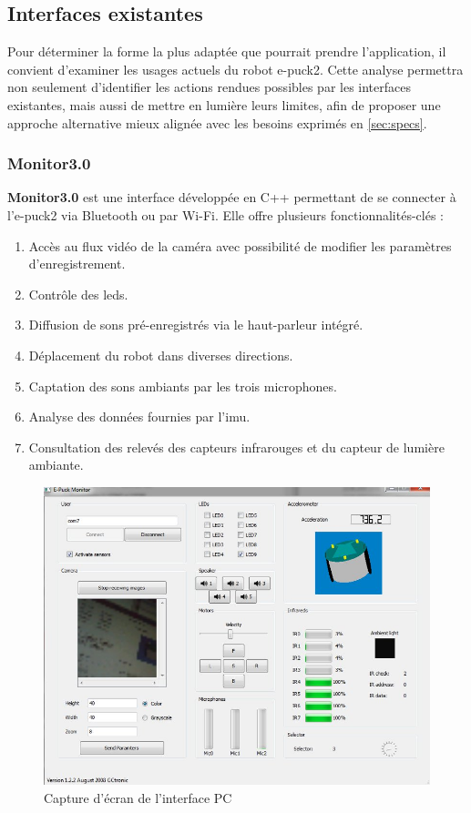 \subsection{Interfaces existantes} \label{sec:interfaces_existantes}

Pour déterminer la forme la plus adaptée que pourrait prendre l’application, il convient d’examiner les usages actuels du robot e-puck2.  
Cette analyse permettra non seulement d’identifier les actions rendues possibles par les interfaces existantes, mais aussi de mettre en lumière leurs limites, afin de proposer une approche alternative mieux alignée avec les besoins exprimés en \autoref{sec:specs}.

\subsubsection{Monitor3.0}
\textbf{Monitor3.0} est une interface développée en C++ permettant de se connecter à l'e-puck2 via Bluetooth \autocite{noauthor_e-puck2monitor_2024} ou par Wi-Fi.
Elle offre plusieurs fonctionnalités-clés :
\begin{enumerate}
    \item Accès au flux vidéo de la caméra avec possibilité de modifier les paramètres d'enregistrement.  
    \item Contrôle des \acrshort{led}s.  
    \item Diffusion de sons pré-enregistrés via le haut-parleur intégré.  
    \item Déplacement du robot dans diverses directions.  
    \item Captation des sons ambiants par les trois microphones.  
    \item Analyse des données fournies par l'\acrshort{imu}.
    \item Consultation des relevés des capteurs infrarouges et du capteur de lumière ambiante.  
\end{enumerate}

\begin{figure}[H]
    \centering
    \includegraphics[width=0.6\linewidth]{.//figures//Monitor3.0.png}
    \caption{Capture d'écran de l'interface PC \autocite{gctronic_e-puck2_nodate}}
    \label{fig:screenshot_monitor_interface}
\end{figure}


